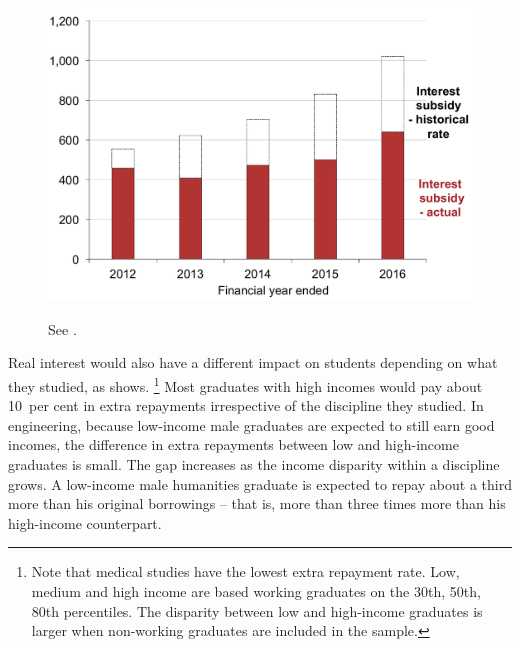\documentclass[embargoed]{grattan}
\begin{document}
\begin{figure}
\begin{minipage}[t][\textheight]{\columnwidth}

\includegraphics[page=15]{atlas/Chartpack.pdf}

{See .}
\end{minipage}
\end{figure}



Real interest would also have a different impact on students depending on what they studied, as  shows.%
\footnote{Note that medical studies have the lowest extra repayment rate.
Low, medium and high income are based working graduates on the 30{th}, 50{th}, 80{th} percentiles.\label{fn:low-med-high-dfns}
The disparity between low and high-income graduates is larger when non-working graduates are included in the sample.} Most graduates with high incomes would pay about 10~per cent in extra repayments irrespective of the discipline they studied.
In engineering, because low-income male graduates are expected to still earn good incomes, the difference in extra repayments between low and high-income graduates is small.
The gap increases as the income disparity within a discipline grows.
A low-income male humanities graduate is expected to repay about a third more than his original borrowings -- that is, more than three times more than his high-income counterpart.
\end{document}
